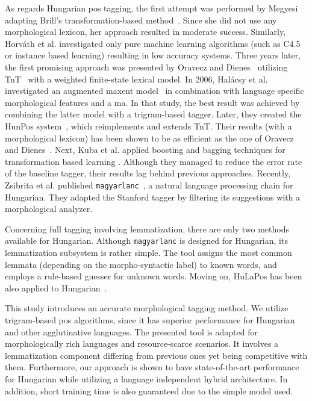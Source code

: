 As regards Hungarian \gls{pos} tagging, the first attempt was performed by Megyesi~\cite{Megyesi1998} adapting Brill’s transformation-based method~\cite{Brill1992}. %
Since she did not use any morphological lexicon, her approach resulted in moderate success.
Similarly, Horváth et al. investigated \cite{Horvath1999} only pure machine learning algorithms (such as C4.5 or instance based learning) resulting in low accuracy systems.
Three years later, the first promising approach was presented by Oravecz and Dienes~\cite{Oravecz2002a} utilizing TnT~\cite{Brants2000} with a weighted finite-state lexical model.
In 2006, Halácsy et al. investigated an augmented \acrshort{maxent} model~\cite{Halacsy2006} in combination with language specific morphological features and a \acrshort{ma}.
In that study, the best result was achieved by combining the latter model with a trigram-based tagger.
Later, they created the HunPos system~\cite{Halacsy2007}, which reimplements and extends TnT.
Their results (with a morphological lexicon) has been shown to be as efficient as the one of Oravecz and Dienes~\cite{Oravecz2002a}.
Next, Kuba et al. applied boosting and bagging techniques for transformation based learning \cite{Kuba2004}.
Although they managed to reduce the error rate of the baseline tagger, their results lag behind previous approaches.
Recently, Zsibrita et al. published \texttt{magyarlanc}~\cite{zsibrata2013magyarlanc}, a natural language processing chain for Hungarian.
They adapted the Stanford tagger by filtering its suggestions with a morphological analyzer. 

Concerning full tagging involving lemmatization, there are only two methods available for Hungarian.
Although \texttt{magyarlanc} is designed for Hungarian, its lemmatization subsystem is rather simple.
The tool assigns the most common lemmata (depending on the morpho-syntactic label) to known words, and employs a rule-based guesser for unknown words.
Moving on, HuLaPos has been also applied to Hungarian~\cite{Laki2013}. %

This study introduces an accurate morphological tagging method.
We utilize trigram-based \gls{pos} algorithms, since it has superior performance for Hungarian and other agglutinative languages.
The presented tool is adapted for morphologically rich languages and resource-scarce scenarios.
It involves a lemmatization component differing from previous ones yet being competitive with them.
Furthermore, our approach is shown to have state-of-the-art performance for Hungarian while utilizing a language independent hybrid architecture.
In addition, short training time is also guaranteed due to the simple model used.



